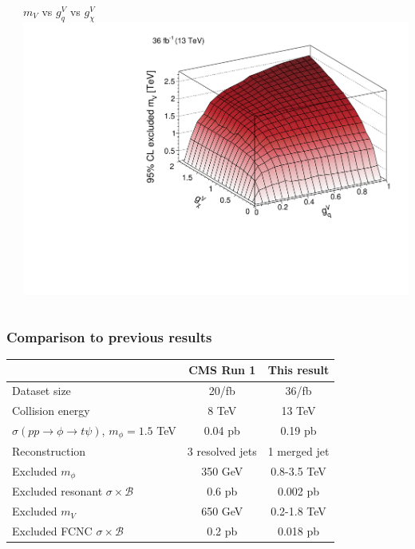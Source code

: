 \documentclass[aspectratio=169,xcolor=dvipsnames,,table,compress]{beamer}
\begin{document}
\begin{frame}[t]
\begin{columns}
\begin{column}{0.33\textwidth}
    \end{column}
    \begin{column}{0.33\textwidth}
      \centering $m_V$ vs $g_q^V$ vs $g_\chi^V$  \\ 
      \includegraphics[width=\textwidth]{../figures/monotop/results/fcnc3d_obs_vector.pdf}
    \end{column}
  \end{columns}
\end{frame}

\begin{frame}[t] \frametitle{Comparison to previous results}
  \centering 
  \vspace{7mm}
  \begin{tabular}{l|c|c} 
    & CMS Run 1 & This result \\ 
    \hline \hline 
    Dataset size & 20/fb & 36/fb \\ 
    Collision energy & 8 TeV & 13 TeV \\ 
    $\sigma(pp\rightarrow\phi\rightarrow t\psi)$, $m_\phi = 1.5$ TeV & 0.04 pb & 0.19 pb \\ 
    Reconstruction & 3 resolved jets & 1 merged jet \\  
    \hline
    Excluded $m_\phi$ & 350 GeV & 0.8-3.5 TeV \\ 
    Excluded resonant $\sigma\times \mathcal{B}$ & 0.6 pb & 0.002 pb \\  
    \hline
    Excluded $m_V$ & 650 GeV & 0.2-1.8 TeV \\ 
    Excluded FCNC $\sigma\times \mathcal{B}$ & 0.2 pb & 0.018 pb \\  
  \end{tabular}
\end{frame}
\end{document}
